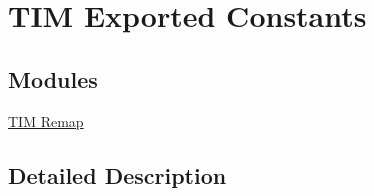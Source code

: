\hypertarget{group___t_i_m_ex___exported___constants}{}\section{T\+IM Exported Constants}
\label{group___t_i_m_ex___exported___constants}
\subsection*{Modules}
\begin{DoxyCompactItemize}
\item 
\hyperlink{group___t_i_m_ex___remap}{T\+I\+M Remap}
\end{DoxyCompactItemize}


\subsection{Detailed Description}
